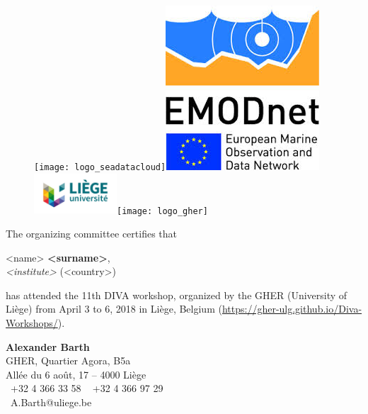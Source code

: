 \documentclass[12pt,svgnames,a4paper]{article}
\begin{document}
 
\thispagestyle{empty}
\large

\begin{figure}
\centering
\texttt{[image: logo\_seadatacloud]}\hspace*{.5cm}\includegraphics[width=.07\paperwidth]{logo_emodnet}\hspace*{.5cm}\includegraphics[height=1.5cm]{logo_uliege}\hspace*{.5cm}\texttt{[image: logo\_gher]}
\end{figure}


\vspace*{\fill}

 
The organizing committee certifies that

\vspace{1cm}

\begin{center}
\parbox{.8\textwidth}{
<name> \textbf{<surname>},\\
\textit{<institute>} (<country>)
}
\end{center}

\vspace{1cm}

has attended the 11th \textsf{DIVA} workshop, organized by the GHER (University of Liège) from April 3 to 6, 2018 in Liège, Belgium (\url{https://gher-ulg.github.io/Diva-Workshops/}).


\vspace{\fill}


\vspace*{1cm}


\begin{center}
\textbf{Alexander Barth}					\\
GHER, Quartier Agora, B5a							\\
All\'{e}e du 6 ao\^{u}t, 17 --  4000 Li\`{e}ge	 	\\
\Telefon~+32 4 366 33 58 \hspace{.5cm}  \Faxmachine~ +32 4 366 97 29 \\
\Letter~A.Barth@uliege.be
\end{center}
\end{document}
